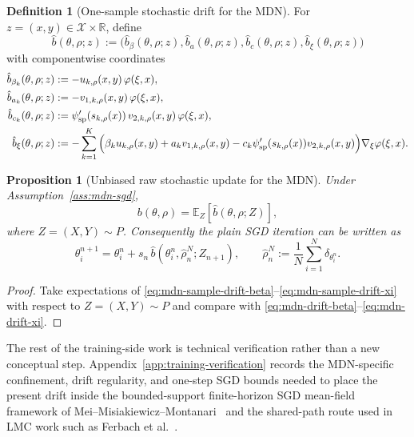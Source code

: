 \documentclass[11pt]{article}
\newtheorem{proposition}[theorem]{Proposition}
\theoremstyle{definition}
\newtheorem{definition}[theorem]{Definition}
\newcommand{\R}{\mathbb{R}}
\newcommand{\E}{\mathbb{E}}
\newcommand{\mc}[1]{\mathcal{#1}}
\begin{document}
\begin{definition}[One-sample stochastic drift for the MDN]
\label{def:mdn-sample-drift}
For $z=(x,y)\in\mc{X}\times\R$, define
\[
  \hat b(\theta,\rho;z)
  :=
  \bigl(\hat b_\beta(\theta,\rho;z),\hat b_a(\theta,\rho;z),\hat b_c(\theta,\rho;z),\hat b_\xi(\theta,\rho;z)\bigr)
\]
with componentwise coordinates
\begin{align}
  \hat b_{\beta_k}(\theta,\rho;z)
  &:=
  -
  u_{k,\rho}(x,y)\,\varphi(\xi,x),
  \label{eq:mdn-sample-drift-beta}
  \\
  \hat b_{a_k}(\theta,\rho;z)
  &:=
  -
  v_{1,k,\rho}(x,y)\,\varphi(\xi,x),
  \label{eq:mdn-sample-drift-a}
  \\
  \hat b_{c_k}(\theta,\rho;z)
  &:=
  \psi_{\rm sp}'(s_{k,\rho}(x))\,v_{2,k,\rho}(x,y)\,\varphi(\xi,x),
  \label{eq:mdn-sample-drift-c}
  \\
  \hat b_\xi(\theta,\rho;z)
  &:=
  -
  \sum_{k=1}^K
  \Big(
    \beta_k u_{k,\rho}(x,y)
    +
    a_k v_{1,k,\rho}(x,y)
    -
    c_k\psi_{\rm sp}'(s_{k,\rho}(x))v_{2,k,\rho}(x,y)
  \Big)\nabla_\xi\varphi(\xi,x).
  \label{eq:mdn-sample-drift-xi}
\end{align}
\end{definition}

\begin{proposition}[Unbiased raw stochastic update for the MDN]
\label{prop:mdn-unbiased-sample-drift}
Under Assumption~\ref{ass:mdn-sgd},
\[
  b(\theta,\rho)=\E_Z[\hat b(\theta,\rho;Z)],
\]
where $Z=(X,Y)\sim P$. Consequently the plain SGD iteration can be written
as
\begin{equation}
  \theta_i^{n+1}
  =
  \theta_i^n
  +
  s_n\,\hat b(\theta_i^n,\hat\rho_n^N;Z_{n+1}),
  \qquad
  \hat\rho_n^N:=\frac1N\sum_{i=1}^N \delta_{\theta_i^n}.
  \label{eq:mdn-sgd-update}
\end{equation}
\end{proposition}

\begin{proof}
Take expectations of
\eqref{eq:mdn-sample-drift-beta}--\eqref{eq:mdn-sample-drift-xi} with respect
to $Z=(X,Y)\sim P$ and compare with
\eqref{eq:mdn-drift-beta}--\eqref{eq:mdn-drift-xi}.
\end{proof}

The rest of the training-side work is technical verification rather than a new
conceptual step. Appendix~\ref{app:training-verification} records the
MDN-specific confinement, drift
regularity, and one-step SGD bounds needed to place the present drift inside the
bounded-support finite-horizon SGD mean-field framework of
Mei--Misiakiewicz--Montanari~\cite{MeiMisiakiewiczMontanari2019} and the
shared-path route used in LMC work such as Ferbach et al.~\cite{FerbachEtAl2024}.
\end{document}
